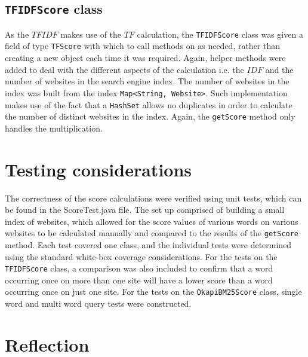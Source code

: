 \subsection{{\tt TFIDFScore} class}
As the $TFIDF$ makes use of the $TF$ calculation, the {\tt TFIDFScore} class was given a field of type {\tt TFScore} with which to call methods on as needed, rather than creating a new object each time it was required. Again, helper methods were added to deal with the different aspects of the calculation i.e. the $IDF$ and the number of websites in the search engine index. The number of websites in the index was built from the index {\tt Map<String, Website>}. Such implementation makes use of the fact that a {\tt HashSet} allows no duplicates in order to calculate the number of distinct websites in the index.
Again, the {\tt getScore} method only handles the multiplication.

\section{Testing considerations}
The correctness of the score calculations were verified using unit tests, which can be found in the ScoreTest.java file.
The set up comprised of building a small index of websites, which allowed for the score values of various words on various
websites to be calculated manually and compared to the results of the {\tt getScore} method.
Each test covered one class, and the individual tests were determined using the standard white-box coverage considerations.
For the tests on the {\tt TFIDFScore} class, a comparison was also included to confirm that a word occurring once on more than one site will have a lower score than a word occurring once on just one site.
For the tests on the {\tt OkapiBM25Score} class, single word and multi word query tests were constructed.

\section{Reflection}

